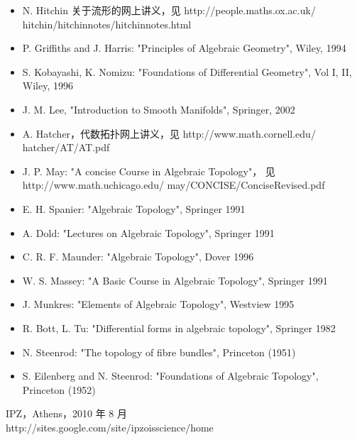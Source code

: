 \begin{itemize}[leftmargin=1.6em,itemsep=1pt]
  \item N. Hitchin 关于流形的网上讲义，见
    http://people.maths.ox.ac.uk/ hitchin/hitchinnotes/hitchinnotes.html
  \item P. Griffiths and J. Harris: "Principles of Algebraic Geometry", Wiley, 1994
  \item S. Kobayashi, K. Nomizu: "Foundations of Differential Geometry", Vol I, II, Wiley, 1996
  \item J. M. Lee, "Introduction to Smooth Manifolds", Springer, 2002
\end{itemize}

\begin{itemize}[leftmargin=1.6em,itemsep=1pt]
  \item A. Hatcher，代数拓扑网上讲义，见 http://www.math.cornell.edu/ hatcher/AT/AT.pdf
  \item J. P. May: "A concise Course in Algebraic Topology"，
    见 http://www.math.uchicago.edu/ may/CONCISE/ConciseRevised.pdf
  \item E. H. Spanier: "Algebraic Topology", Springer 1991
  \item A. Dold: "Lectures on Algebraic Topology", Springer 1991
  \item C. R. F. Maunder: "Algebraic Topology", Dover 1996
  \item W. S. Massey: "A Basic Course in Algebraic Topology", Springer 1991
  \item J. Munkres: "Elements of Algebraic Topology", Westview 1995
  \item R. Bott, L. Tu: "Differential forms in algebraic topology", Springer 1982
  \item N. Steenrod: "The topology of fibre bundles", Princeton (1951)
  \item S. Eilenberg and N. Steenrod: "Foundations of Algebraic Topology", Princeton (1952)
\end{itemize}

\noindent IPZ，Athens，2010 年 8 月\\
http://sites.google.com/site/ipzoisscience/home

